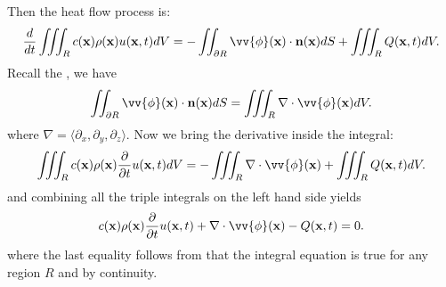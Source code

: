 \documentclass[class=article,crop=false]{standalone}
\begin{document}
Then the heat flow process is:
\[
	\frac{d }{d t} \iiint_R c( \allbold{x}) \rho( \allbold{x} ) u( \allbold{x},t) dV = -\iint_{\partial R} \vv{\phi}( \allbold{x} ) \cdot \allbold{n}(\allbold{x})  dS + \iiint_R Q( \allbold{x},t ) dV
.\] 
Recall the , we have
\[
	\iint_{\partial R} \vv{\phi}( \allbold{x}) \cdot \allbold{n}( \allbold{x}) dS = \iiint_R\nabla \cdot \vv{\phi}( \allbold{x}) dV 
.\] 
where $ \nabla = \langle \partial_x, \partial_y, \partial_z \rangle$. Now we bring the derivative inside the integral:
\[
	\iiint_R c( \allbold{x} ) \rho( \allbold{x}) \frac{\partial }{\partial t} u( \allbold{x},t) dV = -\iiint_R \nabla \cdot \vv{\phi}( \allbold{x})  + \iiint_R Q( \allbold{x},t ) dV
.\] 
and combining all the triple integrals on the left hand side yields
\[
	c( \allbold{x}) \rho( \allbold{x}) \frac{\partial }{\partial t} u( \allbold{x},t) + \nabla \cdot \vv{ \phi} ( \allbold{x}) - Q( \allbold{x},t) =0     
.\]
where the last equality follows from that the integral equation is true for any region $ R$ and by continuity. 
\end{document}
